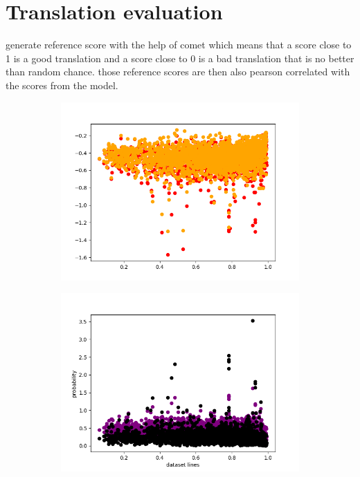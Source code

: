 \section{Translation evaluation}

generate reference score with the help of comet \cite{rei-etal-2020-comet} which means that a score close to 1 is a good translation and a score close to 0 is a bad translation that is no better than random chance.
those reference scores are then also pearson correlated with the scores from the model. 
\begin{figure}[h]
    \centering
    
    \begin{subfigure}{0.4\linewidth}
        \includegraphics[width=\textwidth]{Latex/sections/images/seamlessprob.png}
    \end{subfigure}
    \begin{subfigure}{0.4\linewidth}
        \includegraphics[width=\textwidth]{Latex/sections/images/seamlessdivanddropout.png}

\end{subfigure}
\end{figure}
